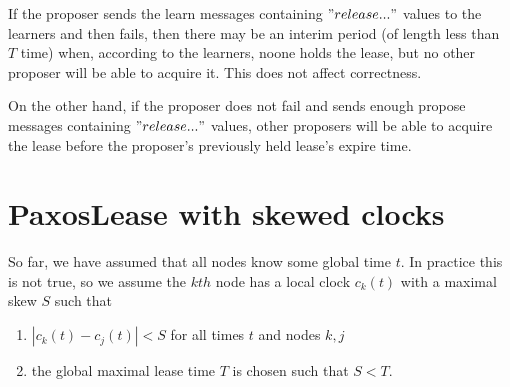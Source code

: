\documentclass[12pt]{amsart}
\begin{document}
If the proposer sends the learn messages containing $"release..."$ values to the learners and then fails, then there may be an interim period (of length less than $T$ time) when, according to the learners, noone holds the lease, but no other proposer will be able to acquire it. This does not affect correctness.

On the other hand, if the proposer does not fail and sends enough propose messages containing $"release..."$ values, other proposers will be able to acquire the lease before the proposer's previously held lease's expire time.

\section{ PaxosLease with skewed clocks }

So far, we have assumed that all nodes know some global time $t$. In practice this is not true, so we assume the $kth$ node has a local clock $c_k(t)$ with a maximal skew $S$ such that

\begin{enumerate}

\item $|c_k(t) - c_j(t)| < S$ for all times $t$ and nodes $k, j$

\item the global maximal lease time $T$ is chosen such that $S < T$.

\end{enumerate}
\end{document}
